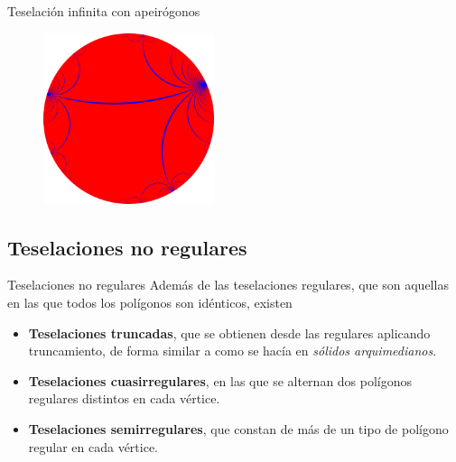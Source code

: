 \documentclass[compress]{beamer}
\begin{document}
\begin{frame}{Teselación infinita con apeirógonos}
  \begin{figure}[ht!]
    \centering
    \includegraphics[width=50mm]{./tiling-i-i.png}
  \end{figure}
\end{frame}

\subsection{Teselaciones no regulares}
\begin{frame}{Teselaciones no regulares}
  Además de las teselaciones regulares, que son aquellas en las que
  todos los polígonos son idénticos, existen

  \begin{itemize}
  \item \textbf{Teselaciones truncadas}, que se obtienen desde las
    regulares aplicando truncamiento, de forma similar a como se hacía
    en \textit{sólidos arquimedianos}.
    \pause
  \item \textbf{Teselaciones cuasirregulares}, en las que se alternan
    dos polígonos regulares distintos en cada vértice.
    \pause
  \item \textbf{Teselaciones semirregulares}, que constan de más de un
    tipo de polígono regular en cada vértice.
  \end{itemize}
\end{frame}
\end{document}
